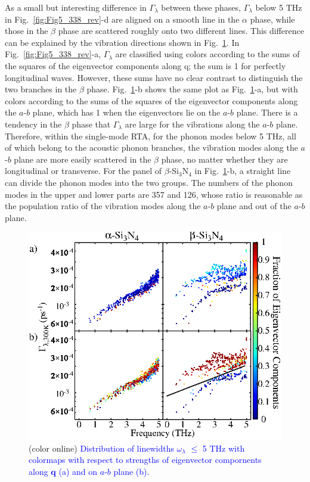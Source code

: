 \documentclass[twocolumn,amsmath,amssymb,a4paper,prb,superscriptaddress,floatfix]{revtex4-1}
\begin{document}
As a small but interesting difference in $\Gamma_\lambda$ between these phases,
$\Gamma_\lambda$ below 5 THz in Fig.~\ref{fig:Fig5_338_rev}-d are aligned on a
smooth line in the $\alpha$ phase, while those in the $\beta$ phase are
scattered roughly onto two different lines. This difference can be explained by
the vibration directions shown in Fig.~\ref{fig:Fig7_338}. In
Fig.~\ref{fig:Fig5_338_rev}-a, $\Gamma_\lambda$ are classified using colors
according to the sums of the squares of the eigenvector components along q; the
sum is 1 for perfectly longitudinal waves. However, these sums have no clear
contrast to distinguish the two branches in the $\beta$ phase.
Fig.~\ref{fig:Fig7_338}-b shows the same plot as Fig.~\ref{fig:Fig7_338}-a, but
with colors according to the sums of the squares of the eigenvector components
along the $a$-$b$ plane, which has 1 when the eigenvectors lie on the $a$-$b$
plane. There is a tendency in the $\beta$ phase that  $\Gamma_\lambda$ are
large for the vibrations along the $a$-$b$ plane. Therefore, within the
single-mode RTA, for the phonon modes below 5 THz, all of which belong to the
acoustic phonon branches, the vibration modes along the $a$-$b$ plane are more
easily scattered in the $\beta$ phase, no matter whether they are longitudinal
or transverse. For the panel of $\beta$-Si$_3$N$_4$ in
Fig.~\ref{fig:Fig7_338}-b, a straight line can divide the phonon modes into the
two groups. The numbers of the phonon modes in the upper and lower parts are
357 and 126, whose ratio is reasonable as the population ratio of the vibration
modes along the $a$-$b$ plane and out of the $a$-$b$ plane.


\begin{figure}[ht]
 \centering
  \includegraphics[width=\linewidth]{figure_analyze_gamma3.eps} \caption{(color
	  online) \textcolor{blue}{Distribution of linewidths $\omega_\lambda$ $\leq$ 5 THz
		  with colormaps with respect to strengths of eigenvector compornents along $\mathbf q$ (a)
		  and on $a$-$b$ plane (b).} \label{fig:Fig7_338}} 
 \centering
\end{figure}
\end{document}

